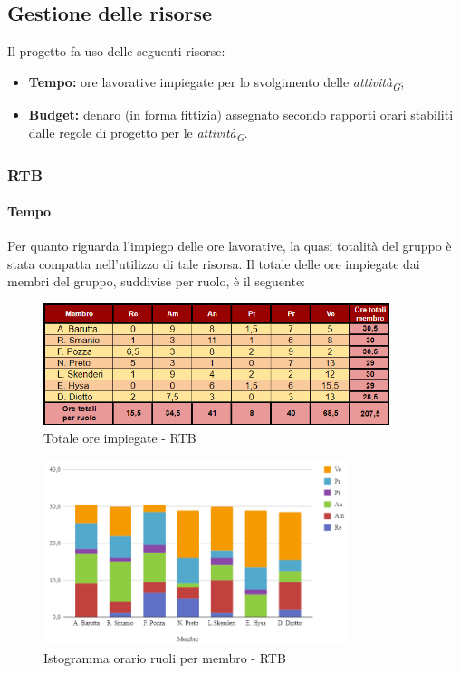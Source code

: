 \subsection{Gestione delle risorse}
Il progetto fa uso delle seguenti risorse:

\begin{itemize}
  \item \textbf{Tempo:} ore lavorative impiegate per lo svolgimento delle \textit{attività}\textsubscript{\textit{G}};
  \item \textbf{Budget:} denaro (in forma fittizia) assegnato secondo rapporti orari stabiliti dalle regole di progetto per le \textit{attività}\textsubscript{\textit{G}}.
\end{itemize}

\subsubsection{RTB}

\paragraph{Tempo}
Per quanto riguarda l’impiego delle ore lavorative, la quasi totalità del gruppo è stata compatta nell’utilizzo di tale risorsa.
Il totale delle ore impiegate dai membri del gruppo, suddivise per ruolo, è il seguente:

\begin{figure}[H]
    \centering
    \includegraphics[width=0.9\textwidth]{../Images/riepilogoRTBOreMembro.png}
    \caption{Totale ore impiegate - RTB}
    \label{fig:Tot_oreRTB}
\end{figure}

\vspace{0.6cm}

\begin{figure}[H]
    \centering
    \includegraphics[width=0.8\textwidth]{../Images/graficoOrarioRuoloRTB.png}
    \caption{Istogramma orario ruoli per membro - RTB}
    \label{fig:GraficoOreRTB}
\end{figure}

